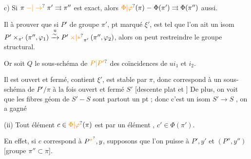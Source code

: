 c) Si $\pi\mathrel{\unsure{-|\to}}\pi'\rightrightarrows\pi''$ est exact,
alors  $\unsure{\Phi|\varphi}(\pi)\mathrel{-}\Phi(\pi')\rightrightarrows\Phi(\pi'')$ aussi.

Il  à prouver que si $P'$ de groupe $\pi'$,
pt marqué $\xi'$, est tel que  l'on
ait un isom $P'\times_{\pi'}(\pi'',\varphi_1)\overset{u}{\xrightarrow{\sim}}P'\mathbin{\unsure{\times|*}}_{\pi'}(\pi'',\varphi_2)$,
alors on peut restreindre le groupe structural.

Or soit $Q$ le sous-schéma de $\unsure{P|P'}$
des coïncidences de $ui_1$ et $i_2$.


Il est ouvert et fermé, contient
$\xi'$, est stable par $\pi$, donc
correspond à un sous-schéma de
$P'/\pi$ à la fois ouvert et fermé $S'$
[descente   plat et  ]
De plus, on voit que les  fibres géom
de $S'\mathrel{-}S$ sont partout un pt ; donc
c'est un isom $S'\to S$ , on a gagné


(ii) Tout élément $c\in\unsure{\Phi|\varphi}(\pi)$ est  par
un élément , $c'\in\Phi(\pi')$.


En effet, si $c$ correspond à $P^{\unsure{\pi}},y$,
supposons que l'on puisse  à $P',y'$  
et $(P'',y'')$ [groupe $\pi''\subset\pi$].

